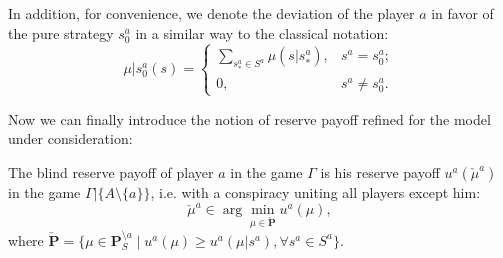 In addition, for convenience, we denote the deviation of the player $a$ in favor of the pure strategy $s^a_0$ in a similar way to the classical notation: %
\begin{equation*}
	\mu | s^a_0(s) =
	\begin{cases}
		\sum_{s^a_* \in S^a} \mu(s | s^a_*), & s^a = s^a_0; \\
		0, & s^a \neq s^a_0.
	\end{cases}
\end{equation*}

Now we can finally introduce the notion of reserve payoff refined for the model under consideration: %
\begin{definition}
	The blind reserve payoff of player $a$ in the game $\Gamma$ is his reserve payoff $u^a(\check{\mu}^a)$ in the game $\Gamma | \{A \setminus \{a\}\}$, i.e. with a conspiracy uniting all players except him: %
	\begin{equation*}
		\check{\mu}^a \in \arg\min_{\mu \in \check{\mathbf{P}}} u^a(\mu),
	\end{equation*}
	where $\check{\mathbf{P}} = \{\mu \in \mathbf{P}_S^{\setminus a} \mid u^a(\mu) \ge u^a(\mu | s^a), \forall s^a \in S^a\}$.
\end{definition}


